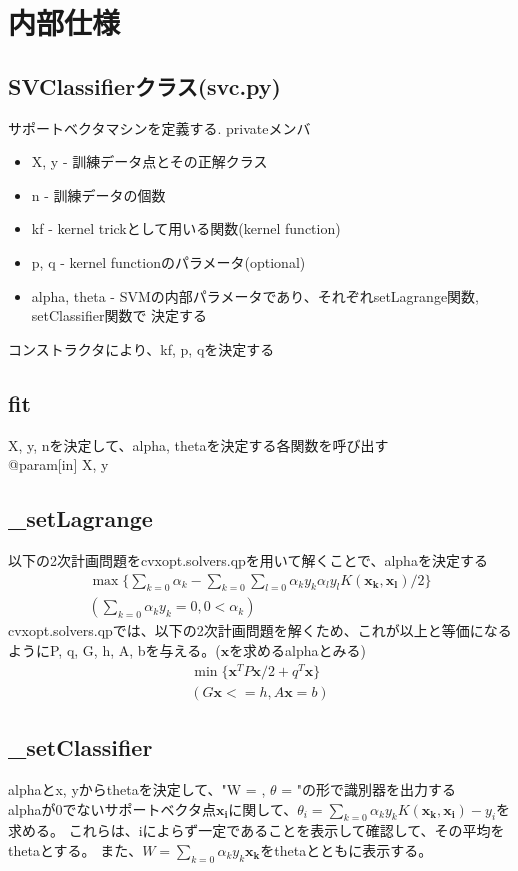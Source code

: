 \documentclass{jsarticle}
\begin{document}
\section{内部仕様}
\subsection*{SVClassifierクラス(svc.py)}
サポートベクタマシンを定義する.
privateメンバ
\begin{itemize}
    \item X, y - 訓練データ点とその正解クラス
    \item n - 訓練データの個数
    \item kf - kernel trickとして用いる関数(kernel function)
    \item p, q - kernel functionのパラメータ(optional)
    \item alpha, theta - SVMの内部パラメータであり、それぞれsetLagrange関数, setClassifier関数で
    決定する
\end{itemize}
コンストラクタにより、kf, p, qを決定する
\subsection*{fit}
X, y, nを決定して、alpha, thetaを決定する各関数を呼び出す \\
@param[in] X, y

\subsection*{\_setLagrange}
以下の2次計画問題をcvxopt.solvers.qpを用いて解くことで、alphaを決定する \\
\begin{eqnarray}
\max \{\sum_{k=0} \alpha_k - \sum_{k=0} \sum_{l=0} \alpha_k y_k \alpha_l y_l K(\bm{x_k}, \bm{x_l}) / 2\} \\
(\sum_{k=0} \alpha_k y_k = 0, 0 < \alpha_k)
\end{eqnarray}
cvxopt.solvers.qpでは、以下の2次計画問題を解くため、これが以上と等価になるようにP, q, G, h, A, bを与える。($\bm{x}$を求めるalphaとみる)
\begin{eqnarray}
\min \{\bm{x}^T P \bm{x} / 2 + q^T \bm{x}\} \\
(G \bm{x} <= h, A \bm{x} = b)
\end{eqnarray}

\subsection*{\_setClassifier}
alphaとx, yからthetaを決定して、"W = , $\theta$ = "の形で識別器を出力する \\
alphaが0でないサポートベクタ点$\bm{x_i}$に関して、$\theta_i = \sum_{k=0} \alpha_k y_k K(\bm{x_k}, \bm{x_i}) - y_i$を求める。
これらは、iによらず一定であることを表示して確認して、その平均をthetaとする。
また、$W=\sum_{k=0} \alpha_k y_k \bm{x_k}$をthetaとともに表示する。
\end{document}
